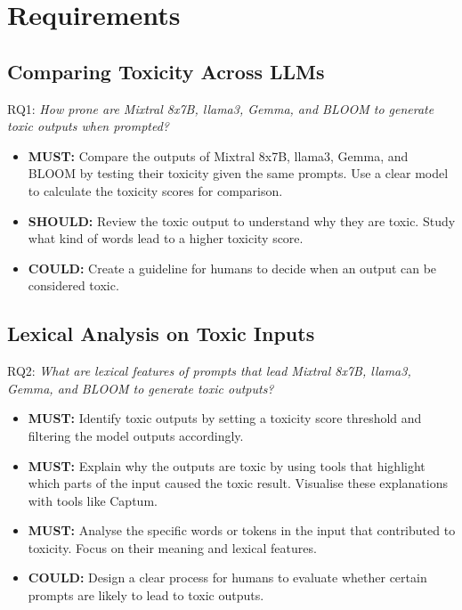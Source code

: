 \section{Requirements}

\subsection{Comparing Toxicity Across LLMs}
RQ1: \textit{How prone are Mixtral 8x7B, llama3, Gemma, and BLOOM to generate toxic outputs when prompted?}
\begin{itemize}
    \item \textbf{MUST:} Compare the outputs of Mixtral 8x7B, llama3, Gemma, and BLOOM by testing their toxicity given the same prompts. Use a clear model to calculate the toxicity scores for comparison.
    
    \item \textbf{SHOULD:} Review the toxic output to understand why they are toxic. Study what kind of words lead to a higher toxicity score.
    
    \item \textbf{COULD:} Create a guideline for humans to decide when an output can be considered toxic.
\end{itemize}

\subsection{Lexical Analysis on Toxic Inputs}
RQ2: \textit{What are lexical features of prompts that lead  Mixtral 8x7B, llama3, Gemma, and BLOOM to generate toxic outputs?}
\begin{itemize}
    \item \textbf{MUST:} Identify toxic outputs by setting a toxicity score threshold and filtering the model outputs accordingly.
    
    \item \textbf{MUST:} Explain why the outputs are toxic by using tools that highlight which parts of the input caused the toxic result. Visualise these explanations with tools like Captum.
    
    \item \textbf{MUST:} Analyse the specific words or tokens in the input that contributed to toxicity. Focus on their meaning and lexical features.
    
    \item \textbf{COULD:} Design a clear process for humans to evaluate whether certain prompts are likely to lead to toxic outputs.
\end{itemize}

